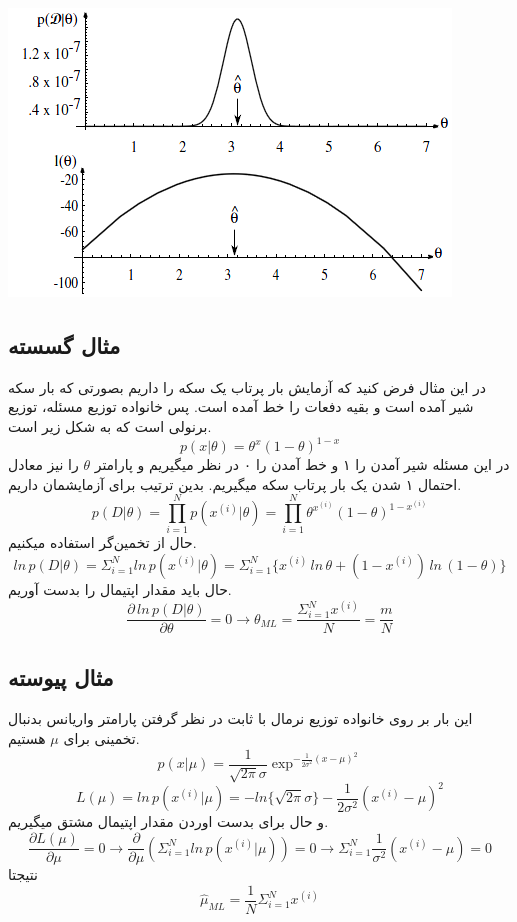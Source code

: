 \documentclass[12pt]{article}
\begin{document}
\includegraphics[width=\textwidth]{figs/Lograithm.png}

\subsection*{مثال گسسته}
در این مثال فرض کنید که آزمایش 
بار پرتاب یک سکه را داریم بصورتی که 
بار سکه شیر آمده است و بقیه دفعات را خط آمده است.
پس خانواده توزیع مسئله، توزیع برنولی است که به شکل زیر است.
\[p(x|\theta) = \theta^x (1 - \theta)^{1-x}\]
در این مسئله شیر آمدن را ۱ و خط آمدن را ۰ در نظر میگیریم و پارامتر 
$\theta$
را نیز معادل احتمال ۱ شدن یک بار پرتاب سکه میگیریم. 
بدین ترتیب برای آزمایشمان داریم.
\[p(D|\theta) = \prod_{i=1}^{N} p(x^{(i)}|\theta) = \prod_{i=1}^{N} \theta^{x^{(i)}} (1 - \theta)^{1 - x^{(i)}}\]
حال از تخمین‌گر استفاده میکنیم.
\[ln\,p(D|\theta) = \Sigma_{i=1}^{N}ln\,p(x^{(i)}|\theta)
    = \Sigma_{i=1}^{N} \{x^{(i)}\,ln\,\theta + (1 - x^{(i)})\,ln\,(1 - \theta)\}\]
حال باید مقدار اپتیمال را بدست آوریم.
\[\frac{\partial\, ln\,p(D|\theta)}{\partial\theta} = 0 \xrightarrow{}
    \theta_{ML} = \frac{\Sigma_{i=1}^{N} x^{(i)}}{N} = \frac{m}{N}\]
\subsection{مثال پیوسته}
این بار بر روی خانواده توزیع نرمال با ثابت در نظر گرفتن پارامتر واریانس بدنبال تخمینی برای 
$\mu$
هستیم.
\[p(x|\mu) = \frac{1}{\sqrt{2\pi}\sigma}\exp^{-\frac{1}{2\sigma^2}(x - \mu)^2}\]
\[L(\mu) = ln\,p(x^{(i)}|\mu) = -ln\{\sqrt{2\pi}\sigma\} - \frac{1}{2\sigma^2}(x^{(i)} - \mu)^2\]
و حال برای بدست اوردن مقدار اپتیمال مشتق میگیریم.
\[\frac{\partial L(\mu)}{\partial \mu} = 0 \xrightarrow[]{} \frac{\partial}{\partial\mu}(\Sigma_{i=1}^{N} ln\,p(x^{(i)}|\mu)) = 0 \xrightarrow[]{}
    \Sigma_{i=1}^{N} \frac{1}{\sigma^2}(x^{(i)} - \mu) = 0\]
نتیجتا
\[\hat{\mu}_{ML} = \frac{1}{N}\Sigma_{i=1}^{N}x^{(i)}\]
\end{document}
